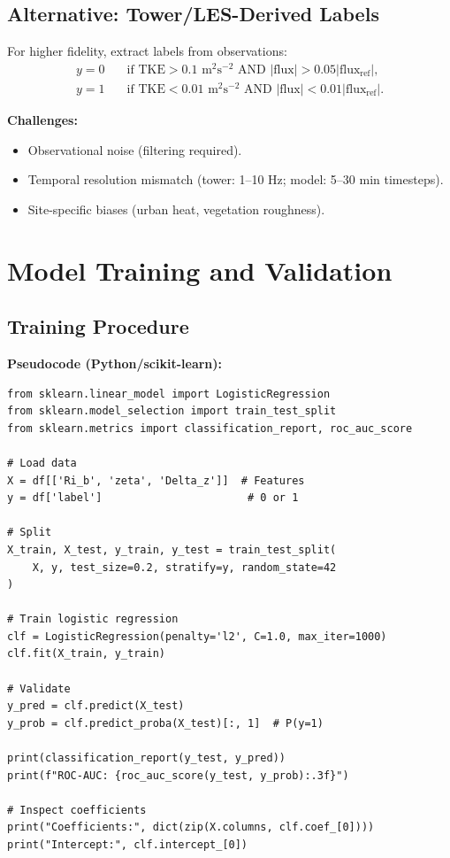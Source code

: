 \documentclass[11pt]{article}
\begin{document}
\subsection{Alternative: Tower/LES-Derived Labels}

For higher fidelity, extract labels from observations:
\begin{align}
y = 0 &\quad \text{if TKE} > 0.1 \text{ m}^2\text{s}^{-2} \text{ AND } |\text{flux}| > 0.05 |\text{flux}_{\text{ref}}|, \label{eq:tower_turbulent} \\
y = 1 &\quad \text{if TKE} < 0.01 \text{ m}^2\text{s}^{-2} \text{ AND } |\text{flux}| < 0.01 |\text{flux}_{\text{ref}}|. \label{eq:tower_laminar}
\end{align}

\textbf{Challenges:}
\begin{itemize}[leftmargin=*]
\item Observational noise (filtering required).
\item Temporal resolution mismatch (tower: 1--10 Hz; model: 5--30 min timesteps).
\item Site-specific biases (urban heat, vegetation roughness).
\end{itemize}

\section{Model Training and Validation}

\subsection{Training Procedure}

\textbf{Pseudocode (Python/scikit-learn):}
\begin{verbatim}
from sklearn.linear_model import LogisticRegression
from sklearn.model_selection import train_test_split
from sklearn.metrics import classification_report, roc_auc_score

# Load data
X = df[['Ri_b', 'zeta', 'Delta_z']]  # Features
y = df['label']                       # 0 or 1

# Split
X_train, X_test, y_train, y_test = train_test_split(
    X, y, test_size=0.2, stratify=y, random_state=42
)

# Train logistic regression
clf = LogisticRegression(penalty='l2', C=1.0, max_iter=1000)
clf.fit(X_train, y_train)

# Validate
y_pred = clf.predict(X_test)
y_prob = clf.predict_proba(X_test)[:, 1]  # P(y=1)

print(classification_report(y_test, y_pred))
print(f"ROC-AUC: {roc_auc_score(y_test, y_prob):.3f}")

# Inspect coefficients
print("Coefficients:", dict(zip(X.columns, clf.coef_[0])))
print("Intercept:", clf.intercept_[0])
\end{verbatim}
\end{document}
